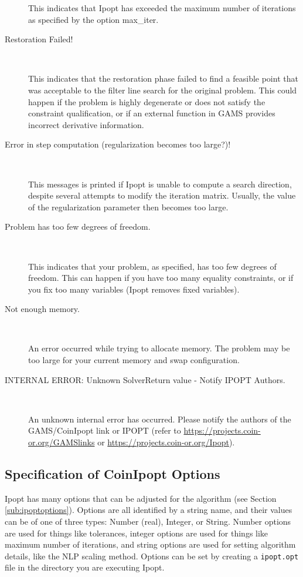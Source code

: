 \begin{description}
    This indicates that Ipopt has exceeded the maximum number of iterations as specified by the option max\_iter.

\item[Restoration Failed!] ~

    This indicates that the restoration phase failed to find a feasible point that was acceptable to the filter line search for the original problem.
    This could happen if the problem is highly degenerate or does not satisfy the constraint qualification, or if an external function in GAMS provides incorrect derivative information.

\item[Error in step computation (regularization becomes too large?)!] ~

    This messages is printed if Ipopt is unable to compute a search direction, despite several attempts to modify the iteration matrix.
    Usually, the value of the regularization parameter then becomes too large.

\item[Problem has too few degrees of freedom.] ~

    This indicates that your problem, as specified, has too few degrees of freedom.
    This can happen if you have too many equality constraints, or if you fix too many variables (Ipopt removes fixed variables).

\item[Not enough memory.] ~

    An error occurred while trying to allocate memory.
    The problem may be too large for your current memory and swap configuration.

\item[INTERNAL ERROR: Unknown SolverReturn value - Notify IPOPT Authors.] ~

    An unknown internal error has occurred. Please notify the authors of the GAMS/CoinIpopt link or IPOPT (refer to \url{https://projects.coin-or.org/GAMSlinks} or \url{https://projects.coin-or.org/Ipopt}).
\end{description}


\subsection{Specification of CoinIpopt Options}
\label{sub:ipoptoptionspec}

Ipopt has many options that can be adjusted for the algorithm (see Section \ref{sub:ipoptoptions}).
Options are all identified by a string name, and their values can be of one of three types: Number (real), Integer, or String.
Number options are used for things like tolerances, integer options are used for things like maximum number of iterations, and string options are used for setting algorithm details, like the NLP scaling method.
Options can be set by creating a \texttt{ipopt.opt} file in the directory you are executing Ipopt.

